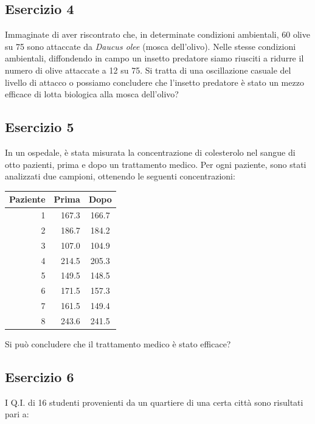 \documentclass[a4paper,12pt,oneside]{book}
\begin{document}
\hypertarget{esercizio-4-4}{%
\subsection{Esercizio 4}\label{esercizio-4-4}}

Immaginate di aver riscontrato che, in determinate condizioni ambientali, 60 olive su 75 sono attaccate da \emph{Daucus olee} (mosca dell'olivo). Nelle stesse condizioni ambientali, diffondendo in campo un insetto predatore siamo riusciti a ridurre il numero di olive attaccate a 12 su 75. Si tratta di una oscillazione casuale del livello di attacco o possiamo concludere che l'insetto predatore è stato un mezzo efficace di lotta biologica alla mosca dell'olivo?

\hypertarget{esercizio-5-4}{%
\subsection{Esercizio 5}\label{esercizio-5-4}}

In un ospedale, è stata misurata la concentrazione di colesterolo nel sangue di otto pazienti, prima e dopo un trattamento medico. Per ogni paziente, sono stati analizzati due campioni, ottenendo le seguenti concentrazioni:

\begin{longtable}[]{@{}rrc@{}}
\toprule
Paziente & Prima & Dopo \\
\midrule
\endhead
1 & 167.3 & 166.7 \\
2 & 186.7 & 184.2 \\
3 & 107.0 & 104.9 \\
4 & 214.5 & 205.3 \\
5 & 149.5 & 148.5 \\
6 & 171.5 & 157.3 \\
7 & 161.5 & 149.4 \\
8 & 243.6 & 241.5 \\
\bottomrule
\end{longtable}

Si può concludere che il trattamento medico è stato efficace?

\hypertarget{esercizio-6-1}{%
\subsection{Esercizio 6}\label{esercizio-6-1}}

I Q.I. di 16 studenti provenienti da un quartiere di una certa città sono risultati pari a:
\end{document}

